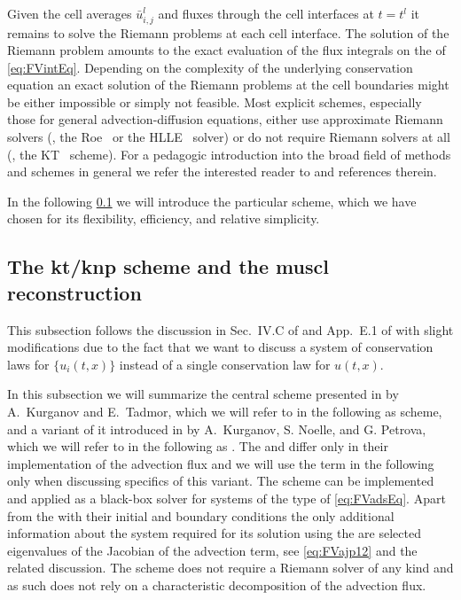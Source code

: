 Given the cell averages $\bar{u}_{i,j}^l$ and fluxes through the cell interfaces at $t=t^l$ it remains to solve the Riemann problems at each cell interface.
The solution of the Riemann problem amounts to the exact evaluation of the flux integrals on the \rhs{} of \cref{eq:FVintEq}.
Depending on the complexity of the underlying conservation equation an exact solution of the Riemann problems at the cell boundaries might be either impossible or simply not feasible.
Most explicit \fv{} schemes, especially those for general advection-diffusion equations, either use approximate Riemann solvers (\eg{}, the Roe~\cite{ROE1981357} or the HLLE~\cite{HLLE1,HLLE2} solver) or do not require Riemann solvers at all (\eg{}, the KT~\cite{KTO2-0} scheme).
For a pedagogic introduction into the broad field of \fv{} methods and \hrsc{} schemes in general we refer the interested reader to  and references therein.

In the following \cref{subsec:hydroKT} we will introduce the particular \fv{} scheme, which we have chosen for its flexibility, efficiency, and relative simplicity.

\subsection{The \texorpdfstring{\acrshort{kt}/\acrshort{knp}}{KT/KNP} scheme and the \texorpdfstring{\acrshort{muscl}}{MUSCL} reconstruction}\label{subsec:hydroKT}
\begin{disclaimer}
	This subsection follows the discussion in Sec.~IV.C of  and App.~E.1 of  with slight modifications due to the fact that we want to discuss a system of conservation laws for $\{u_i ( t, x )\}$ instead of a single conservation law for $u ( t, x )$. 
\end{disclaimer}
In this subsection we will summarize the central scheme presented in  by A.~Kurganov and E.~Tadmor, which we will refer to in the following as  scheme, and a variant of it introduced in  by A.~Kurganov, S. Noelle, and G. Petrova, which we will refer to in the following as \knpScheme{}.
The \kt{} and \knpScheme{} differ only in their implementation of the advection flux and we will use the term \knpScheme{} in the following only when discussing specifics of this variant.
The \kt{} scheme can be implemented and applied as a black-box solver for systems of the type of \cref{eq:FVadsEq}.
Apart from the \pdes{} with their initial and boundary conditions the only additional information about the system required for its solution using the \ktScheme{} are selected eigenvalues of the Jacobian of the advection term, see \cref{eq:FVajp12} and the related discussion.
The scheme does not require a Riemann solver of any kind and as such does not rely on a characteristic decomposition of the advection flux.

